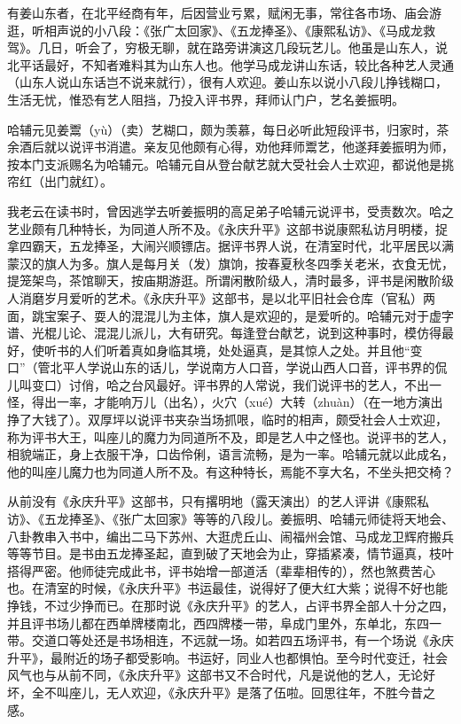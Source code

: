 \documentclass[12pt,UTF8]{ctexbook}
\begin{document}
有姜山东者，在北平经商有年，后因营业亏累，赋闲无事，常往各市场、庙会游逛，听相声说的小八段：《张广太回家》、《五龙捧圣》、《康熙私访》、《马成龙救驾》。几日，听会了，穷极无聊，就在路旁讲演这几段玩艺儿。他虽是山东人，说北平话最好，不知者难料其为山东人也。他学马成龙讲山东话，较比各种艺人灵通（山东人说山东话岂不说来就行），很有人欢迎。姜山东以说小八段儿挣钱糊口，生活无忧，惟恐有艺人阻挡，乃投入评书界，拜师认门户，艺名姜振明。

哈辅元见姜鬻（yù）（卖）艺糊口，颇为羡慕，每日必听此短段评书，归家时，茶余酒后就以说评书消遣。亲友见他颇有心得，劝他拜师鬻艺，他遂拜姜振明为师，按本门支派赐名为哈辅元。哈辅元自从登台献艺就大受社会人士欢迎，都说他是挑帘红（出门就红）。

我老云在读书时，曾因逃学去听姜振明的高足弟子哈辅元说评书，受责数次。哈之艺业颇有几种特长，为同道人所不及。《永庆升平》这部书说康熙私访月明楼，捉拿四霸天，五龙捧圣，大闹兴顺镖店。据评书界人说，在清室时代，北平居民以满蒙汉的旗人为多。旗人是每月关（发）旗饷，按春夏秋冬四季关老米，衣食无忧，提笼架鸟，茶馆聊天，按庙期游逛。所谓闲散阶级人，清时最多，评书是闲散阶级人消磨岁月爱听的艺术。《永庆升平》这部书，是以北平旧社会仓库（官私）两面，跳宝案子、耍人的混混儿为主体，旗人是欢迎的，是爱听的。哈辅元对于虚字谱、光棍儿论、混混儿派儿，大有研究。每逢登台献艺，说到这种事时，模仿得最好，使听书的人们听着真如身临其境，处处逼真，是其惊人之处。并且他“变口”（管北平人学说山东的话儿，学说南方人口音，学说山西人口音，评书界的侃儿叫变口）讨俏，哈之台风最好。评书界的人常说，我们说评书的艺人，不出一怪，得出一率，才能响万儿（出名），火穴（xué）大转（zhuàn）（在一地方演出挣了大钱了）。双厚坪以说评书夹杂当场抓哏，临时的相声，颇受社会人士欢迎，称为评书大王，叫座儿的魔力为同道所不及，即是艺人中之怪也。说评书的艺人，相貌端正，身上衣服干净，口齿伶俐，语言流畅，是为一率。哈辅元就以此成名，他的叫座儿魔力也为同道人所不及。有这种特长，焉能不享大名，不坐头把交椅？

从前没有《永庆升平》这部书，只有撂明地（露天演出）的艺人评讲《康熙私访》、《五龙捧圣》、《张广太回家》等等的八段儿。姜振明、哈辅元师徒将天地会、八卦教串入书中，编出二马下苏州、大逛虎丘山、闹福州会馆、马成龙卫辉府搬兵等等节目。是书由五龙捧圣起，直到破了天地会为止，穿插紧凑，情节逼真，枝叶搭得严密。他师徒完成此书，评书始增一部道活（辈辈相传的），然也煞费苦心也。在清室的时候，《永庆升平》书运最佳，说得好了便大红大紫；说得不好也能挣钱，不过少挣而已。在那时说《永庆升平》的艺人，占评书界全部人十分之四，并且评书场儿都在西单牌楼南北，西四牌楼一带，阜成门里外，东单北，东四一带。交道口等处还是书场相连，不远就一场。如若四五场评书，有一个场说《永庆升平》，最附近的场子都受影响。书运好，同业人也都惧怕。至今时代变迁，社会风气也与从前不同，《永庆升平》这部书又不合时代，凡是说他的艺人，无论好坏，全不叫座儿，无人欢迎，《永庆升平》是落了伍啦。回思往年，不胜今昔之感。
\end{document}
